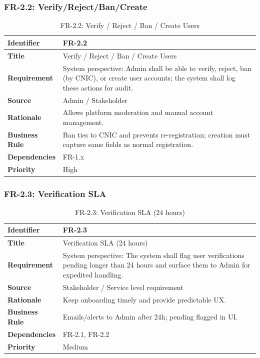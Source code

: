 \subsubsection{FR-2.2: Verify/Reject/Ban/Create}

\begin{longtable}{|p{3cm}|p{12cm}|}
\caption{FR-2.2: Verify / Reject / Ban / Create Users}
\label{tab:fr-2-2} \\
\hline
\rowcolor{lightgray!30}
\textbf{Identifier} & FR-2.2 \\
\hline
\textbf{Title} & Verify / Reject / Ban / Create Users \\
\hline
\textbf{Requirement} & System perspective: Admin shall be able to verify, reject, ban (by CNIC), or create user accounts; the system shall log these actions for audit. \\
\hline
\textbf{Source} & Admin / Stakeholder \\
\hline
\textbf{Rationale} & Allows platform moderation and manual account management. \\
\hline
\textbf{Business Rule} & Ban ties to CNIC and prevents re-registration; creation must capture same fields as normal registration. \\
\hline
\textbf{Dependencies} & FR-1.x \\
\hline
\textbf{Priority} & High \\
\hline
\end{longtable}

\subsubsection{FR-2.3: Verification SLA}

\begin{longtable}{|p{3cm}|p{12cm}|}
\caption{FR-2.3: Verification SLA (24 hours)}
\label{tab:fr-2-3} \\
\hline
\rowcolor{lightgray!30}
\textbf{Identifier} & FR-2.3 \\
\hline
\textbf{Title} & Verification SLA (24 hours) \\
\hline
\textbf{Requirement} & System perspective: The system shall flag user verifications pending longer than 24 hours and surface them to Admin for expedited handling. \\
\hline
\textbf{Source} & Stakeholder / Service level requirement \\
\hline
\textbf{Rationale} & Keep onboarding timely and provide predictable UX. \\
\hline
\textbf{Business Rule} & Emails/alerts to Admin after 24h; pending flagged in UI. \\
\hline
\textbf{Dependencies} & FR-2.1, FR-2.2 \\
\hline
\textbf{Priority} & Medium \\
\hline
\end{longtable}

